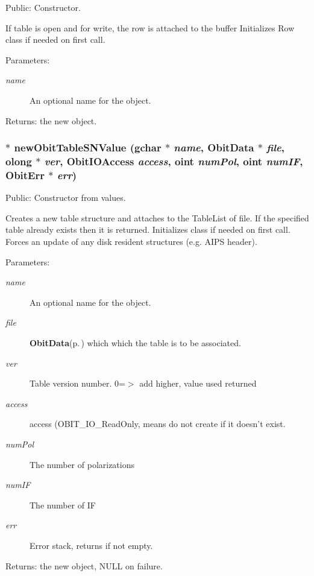 Public: Constructor. 

If table is open and for write, the row is attached to the buffer Initializes Row class if needed on first call. \begin{Desc}
\item[Parameters:]
\begin{description}
\item[{\em name}]An optional name for the object. \end{description}
\end{Desc}
\begin{Desc}
\item[Returns:]the new object. \end{Desc}
\subsubsection{$\ast$ new\-Obit\-Table\-SNValue (gchar $\ast$ {\em name}, {\bf Obit\-Data} $\ast$ {\em file}, {\bf olong} $\ast$ {\em ver}, Obit\-IOAccess {\em access}, {\bf oint} {\em num\-Pol}, {\bf oint} {\em num\-IF}, {\bf Obit\-Err} $\ast$ {\em err})}\label{ObitTableSN_8h_a12}


Public: Constructor from values. 

Creates a new table structure and attaches to the Table\-List of file. If the specified table already exists then it is returned. Initializes class if needed on first call. Forces an update of any disk resident structures (e.g. AIPS header). \begin{Desc}
\item[Parameters:]
\begin{description}
\item[{\em name}]An optional name for the object. \item[{\em file}]{\bf Obit\-Data}{\rm (p.\,\pageref{structObitData})} which which the table is to be associated. \item[{\em ver}]Table version number. 0=$>$ add higher, value used returned \item[{\em access}]access (OBIT\_\-IO\_\-Read\-Only, means do not create if it doesn't exist. \item[{\em num\-Pol}]The number of polarizations \item[{\em num\-IF}]The number of IF \item[{\em err}]Error stack, returns if not empty. \end{description}
\end{Desc}
\begin{Desc}
\item[Returns:]the new object, NULL on failure. \end{Desc}
